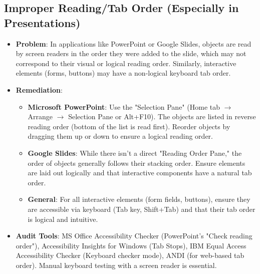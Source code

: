 \subsection{Improper Reading/Tab Order (Especially in Presentations)}
\label{subsec:improper-tab-order}
\begin{itemize}
    \item \textbf{Problem}: In applications like PowerPoint or Google Slides, objects are read by screen readers in the order they were added to the slide, which may not correspond to their visual or logical reading order. Similarly, interactive elements (forms, buttons) may have a non-logical keyboard tab order.

    \item \textbf{Remediation}:
        \begin{itemize}
            \item \textbf{Microsoft PowerPoint}: Use the "Selection Pane" (Home tab $\rightarrow$ Arrange $\rightarrow$ Selection Pane or Alt+F10). The objects are listed in reverse reading order (bottom of the list is read first). Reorder objects by dragging them up or down to ensure a logical reading order.
            \item \textbf{Google Slides}: While there isn't a direct "Reading Order Pane," the order of objects generally follows their stacking order. Ensure elements are laid out logically and that interactive components have a natural tab order.
            \item \textbf{General}: For all interactive elements (form fields, buttons), ensure they are accessible via keyboard (Tab key, Shift+Tab) and that their tab order is logical and intuitive.
        \end{itemize}

    \item \textbf{Audit Tools}: MS Office Accessibility Checker (PowerPoint's "Check reading order"), Accessibility Insights for Windows (Tab Stops), IBM Equal Access Accessibility Checker (Keyboard checker mode), ANDI (for web-based tab order). Manual keyboard testing with a screen reader is essential.

\end{itemize}

